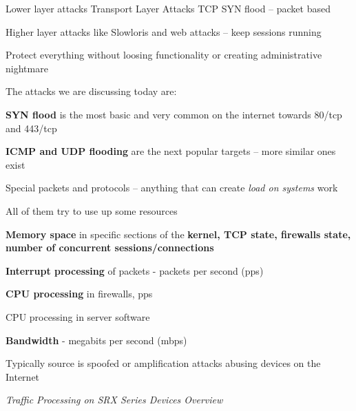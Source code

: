 \documentclass[Screen16to9,17pt]{foils}
\begin{document}
\begin{list2}
\item Lower layer attacks Transport Layer Attacks TCP SYN flood -- packet based
\item Higher layer attacks like Slowloris and web attacks -- keep sessions running
\item Protect everything without loosing functionality or creating administrative nightmare
\end{list2}


The attacks we are discussing today are:
\begin{list2}
\item {\bf SYN flood} is the most basic and very common on the internet towards 80/tcp and 443/tcp
\item {\bf ICMP and UDP flooding} are the next popular targets -- more similar ones exist
\item Special packets and protocols -- anything that can create \emph{load on systems} work
\item All of them try to use up some resources
\begin{list2}
\item {\bf Memory space} in specific sections of the {\bf kernel, TCP state, firewalls state, number of concurrent sessions/connections}
\item {\bf Interrupt processing} of packets - packets per second (pps)
\item {\bf CPU processing} in firewalls, pps
\item CPU processing in server software
\item {\bf Bandwidth} - megabits per second (mbps)
\item Typically source is spoofed or amplification attacks abusing devices on the Internet
\end{list2}
\end{list2}






\emph{Traffic Processing on SRX Series Devices Overview}\\ {\scriptsize
{}}
\end{document}
